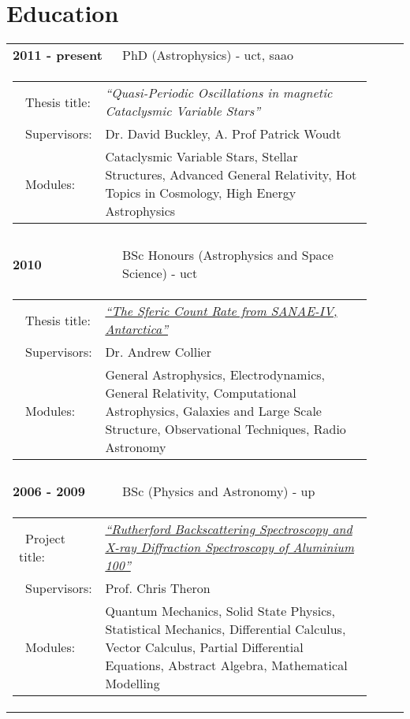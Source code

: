 \documentclass{article}
\newcommand{\homeURL}{http://www.saao.ac.za/~hannes}
\newcommand{\thesesURL}{\homeURL/theses}
\newcommand{\itm}[1]{\textbf{#1}}
\newcommand{\tb}{\textbullet}
\newcommand{\uct}{\gls*{uct}\xspace}
\newcommand{\saao}{\gls*{saao}\xspace}
\begin{document}
\section{Education}
\begin{longtable}{lll}
  \itm{2011 - present} 	& PhD (Astrophysics) - \uct, \saao\ \\
    \multicolumn{3}{c}{\parbox{0.95\textwidth}{
	\begin{tabular}{p{0.175\linewidth}p{0.75\linewidth}}
	  \tb\ Thesis title: 	& \emph{``Quasi-Periodic Oscillations in magnetic Cataclysmic Variable Stars''} \\
	  \tb\ Supervisors:	& Dr. David Buckley, A. Prof Patrick Woudt \\
	  \tb\ Modules: 	& Cataclysmic Variable Stars, Stellar Structures, Advanced General Relativity, Hot Topics in Cosmology, High Energy Astrophysics \\ 
	\end{tabular} }}
      \\ \\
%   
  \itm{2010} 		& BSc Honours (Astrophysics and Space Science) - \uct\ \\
    \multicolumn{3}{c}{\parbox{0.95\textwidth}{
	\begin{tabular}{p{0.175\linewidth}p{0.75\linewidth}}
	  \tb\ Thesis title:	& \href{\thesesURL/2010NASSPHons_Sferics.pdf}{\emph{``The Sferic Count Rate from SANAE-IV, Antarctica''}} \\
	  \tb\ Supervisors:	& Dr. Andrew Collier	\\
	  \tb\ Modules: 	& General Astrophysics, Electrodynamics, General Relativity, Computational Astrophysics, Galaxies and Large Scale Structure, Observational Techniques, Radio Astronomy\\ 
	\end{tabular} }}
      \\ \\
%   
  \itm{2006 - 2009} 		& BSc (Physics and Astronomy) - \gls*{up}\\ %
    \multicolumn{3}{c}{\parbox{0.95\textwidth}{
	\begin{tabular}{p{0.175\linewidth}p{0.75\linewidth}}
	  \tb\ Project title:	& \href{\thesesURL/2009BSc_Al100.pdf}{\emph{``Rutherford Backscattering Spectroscopy and X-ray Diffraction Spectroscopy of Aluminium 100''}} \\
	  \tb\ Supervisors:	& Prof. Chris Theron\\
	  \tb\ Modules: 	& Quantum Mechanics, Solid State Physics, Statistical Mechanics, Differential Calculus, Vector Calculus, Partial Differential Equations, Abstract Algebra, Mathematical Modelling\\
	\end{tabular} }}
      \\
%       
 \end{longtable}
% 
\end{document}
